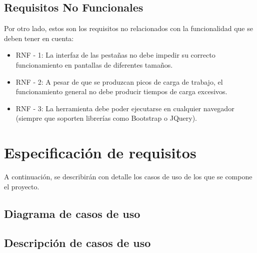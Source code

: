 \subsection{Requisitos No Funcionales}

Por otro lado, estos son los requisitos no relacionados con la funcionalidad que se deben tener en cuenta:

\begin{itemize}

\item RNF - 1: La interfaz de las pestañas no debe impedir su correcto funcionamiento en pantallas de diferentes tamaños.

\item RNF - 2: A pesar de que se produzcan picos de carga de trabajo, el funcionamiento general no debe producir tiempos de carga excesivos.

\item RNF - 3: La herramienta debe poder ejecutarse en cualquier navegador (siempre que soporten librerías como Bootstrap o JQuery).

\end{itemize}

\section{Especificación de requisitos}

A continuación, se describirán con detalle los casos de uso de los que se compone el proyecto.

\subsection{Diagrama de casos de uso}


\subsection{Descripción de casos de uso}